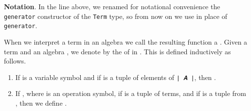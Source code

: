 \textbf{Notation}. In the line above, we renamed for notational
convenience the \texttt{generator} constructor of the \texttt{Term}
type, so from now on we use  in place of \texttt{generator}.

When we interpret a term in an algebra we call the resulting function a
. Given a term  and an algebra
, we denote by  the  of
 in . This is defined inductively as follows.

\begin{enumerate}
\def\labelenumi{\arabic{enumi}.}
\item
  If  is a variable symbol  and if
   is a tuple of elements of
  \texttt{∣\ 𝑨\ ∣}, then .
\item
  If , where  is an operation
  symbol, if  is a tuple of terms, and
  if  is a tuple from , then we
  define
  .
\end{enumerate}

